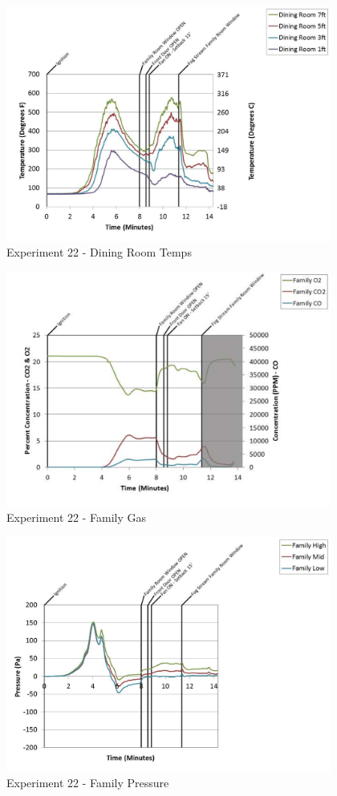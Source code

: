 \documentclass{article}
\begin{document}
\begin{appendices}
	\clearpage

	\begin{figure}[h!]
		\centering
		\includegraphics[height=3.05in]{0_Images/Results_Charts/Exp_22_Charts/DiningRoomTemps.pdf}
		\caption{Experiment 22 - Dining Room Temps}
	\end{figure}
 

	\begin{figure}[h!]
		\centering
		\includegraphics[height=3.05in]{0_Images/Results_Charts/Exp_22_Charts/FamilyGas.pdf}
		\caption{Experiment 22 - Family Gas}
	\end{figure}
 
	\clearpage

	\begin{figure}[h!]
		\centering
		\includegraphics[height=3.05in]{0_Images/Results_Charts/Exp_22_Charts/FamilyPressure.pdf}
		\caption{Experiment 22 - Family Pressure}
	\end{figure}
 


\end{appendices}
\end{document}
